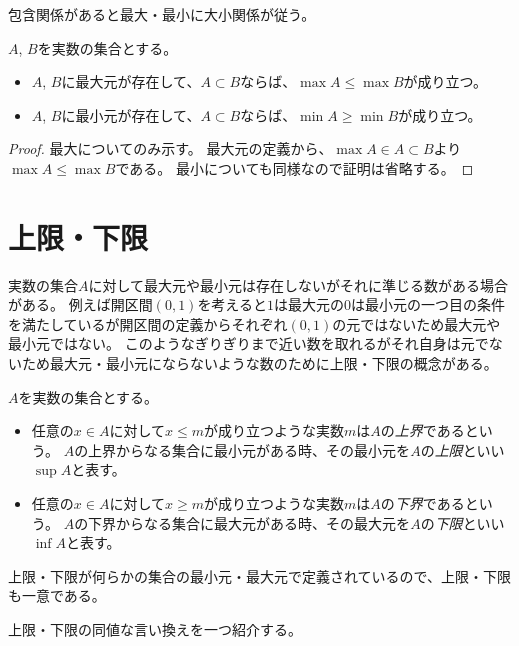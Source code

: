 包含関係があると最大・最小に大小関係が従う。

\begin{proposition}[包含関係と最大・最小]
\label{t_inc_max}
$A$, $B$を実数の集合とする。
\begin{itemize}
\item
$A$, $B$に最大元が存在して、$A \subset B$ならば、$\max A \le \max B$が成り立つ。
\item
$A$, $B$に最小元が存在して、$A \subset B$ならば、$\min A \ge \min B$が成り立つ。
\end{itemize}
\end{proposition}

\begin{proof}
最大についてのみ示す。
最大元の定義から、$\max A \in A \subset B$より$\max A \le \max B$である。
最小についても同様なので証明は省略する。
\end{proof}

\section{上限・下限}

実数の集合$A$に対して最大元や最小元は存在しないがそれに準じる数がある場合がある。
例えば開区間$(0, 1)$を考えると$1$は最大元の$0$は最小元の一つ目の条件を満たしているが開区間の定義からそれぞれ$(0, 1)$の元ではないため最大元や最小元ではない。
このようなぎりぎりまで近い数を取れるがそれ自身は元でないため最大元・最小元にならないような数のために上限・下限の概念がある。

\begin{definition}[集合の上限と下限]
$A$を実数の集合とする。
\begin{itemize}
\item
任意の$x \in A$に対して$x \le m$が成り立つような実数$m$は$A$の\emph{上界}であるという。
$A$の上界からなる集合に最小元がある時、その最小元を$A$の\emph{上限}といい$\sup A$と表す。
\item
任意の$x \in A$に対して$x \ge m$が成り立つような実数$m$は$A$の\emph{下界}であるという。
$A$の下界からなる集合に最大元がある時、その最大元を$A$の\emph{下限}といい$\inf A$と表す。
\end{itemize}
\end{definition}

上限・下限が何らかの集合の最小元・最大元で定義されているので、上限・下限も一意である。

上限・下限の同値な言い換えを一つ紹介する。

